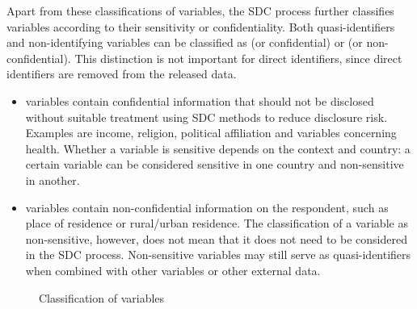 \documentclass[letterpaper,10pt,english]{sphinxmanual}
\begin{document}
Apart from these classifications of variables, the SDC process further
classifies variables according to their sensitivity or confidentiality.
Both quasi-identifiers and non-identifying variables can be classified
as  (or confidential) or  (or
non-confidential). This distinction is not important for direct
identifiers, since direct identifiers are removed from the released
data.
\begin{itemize}
\item {} 
 variables contain confidential information that should
not be disclosed without suitable treatment using SDC methods to
reduce disclosure risk. Examples are income, religion, political
affiliation and variables concerning health. Whether a variable is
sensitive depends on the context and country: a certain variable can
be considered sensitive in one country and non-sensitive in another.

\item {} 
 variables contain non-confidential information on
the respondent, such as place of residence or rural/urban residence.
The classification of a variable as non-sensitive, however, does not
mean that it does not need to be considered in the SDC process.
Non-sensitive variables may still serve as quasi-identifiers when
combined with other variables or other external data.

\end{itemize}

\begin{figure}[htbp]
\centering
\capstart

\noindent{}
\caption{Classification of variables}\label{\detokenize{measure_risk:fig24}}\label{\detokenize{measure_risk:id14}}\end{figure}
\end{document}
